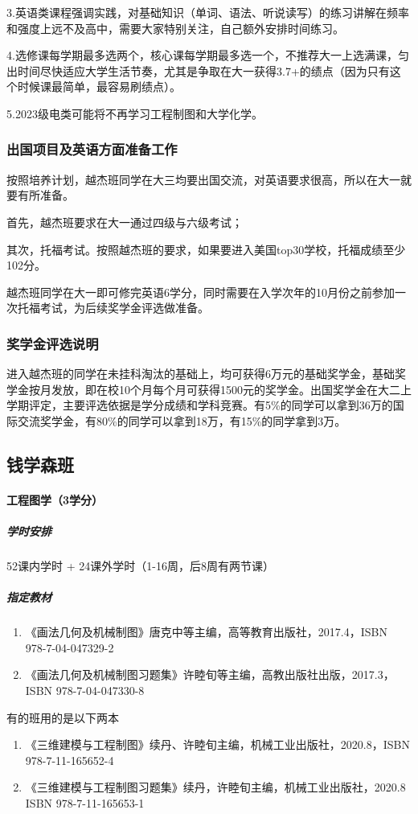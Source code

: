 \documentclass[
decoration,  %
]{qyxf-book}
\begin{document}
3.英语类课程强调实践，对基础知识（单词、语法、听说读写）的练习讲解在频率和强度上远不及高中，需要大家特别关注，自己额外安排时间练习。

4.选修课每学期最多选两个，核心课每学期最多选一个，不推荐大一上选满课，匀出时间尽快适应大学生活节奏，尤其是争取在大一获得3.7+的绩点（因为只有这个时候课最简单，最容易刷绩点）。

5.2023级电类可能将不再学习工程制图和大学化学。

\subsubsection{出国项目及英语方面准备工作}
按照培养计划，越杰班同学在大三均要出国交流，对英语要求很高，所以在大一就要有所准备。

首先，越杰班要求在大一通过四级与六级考试；

其次，托福考试。按照越杰班的要求，如果要进入美国top30学校，托福成绩至少102分。

越杰班同学在大一即可修完英语6学分，同时需要在入学次年的10月份之前参加一次托福考试，为后续奖学金评选做准备。

\subsubsection{奖学金评选说明}
进入越杰班的同学在未挂科淘汰的基础上，均可获得6万元的基础奖学金，基础奖学金按月发放，即在校10个月每个月可获得1500元的奖学金。出国奖学金在大二上学期评定，主要评选依据是学分成绩和学科竞赛。有5\%的同学可以拿到36万的国际交流奖学金，有80\%的同学可以拿到18万，有15\%的同学拿到3万。

\subsection{钱学森班}
\paragraph{工程图学（3学分）}
\subparagraph{学时安排}
52课内学时 + 24课外学时（1-16周，后8周有两节课）

\subparagraph{指定教材}
\begin{enumerate}
	\item 《画法几何及机械制图》唐克中等主编，高等教育出版社，2017.4，ISBN 978-7-04-047329-2
	\item 《画法几何及机械制图习题集》许睦旬等主编，高教出版社出版，2017.3，ISBN 978-7-04-047330-8
\end{enumerate}

有的班用的是以下两本
\begin{enumerate}
	\item 《三维建模与工程制图》续丹、许睦旬主编，机械工业出版社，2020.8，ISBN 978-7-11-165652-4
	\item 《三维建模与工程制图习题集》续丹，许睦旬主编，机械工业出版社，2020.8 ISBN 978-7-11-165653-1
\end{enumerate}
\end{document}
